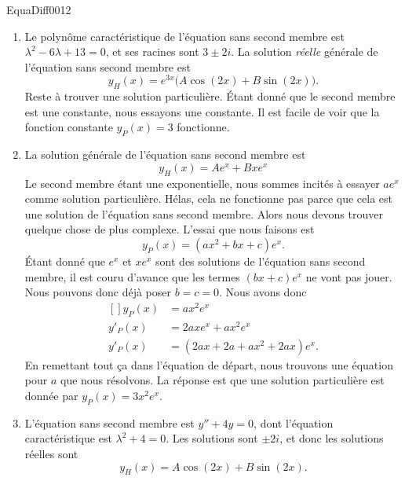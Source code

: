\begin{corrige}{EquaDiff0012}
\begin{enumerate}
		\item
			Le polynôme caractéristique de l'équation sans second membre est $\lambda^2-6\lambda+13=0$, et ses racines sont $3\pm 2i$. La solution \emph{réelle} générale de l'équation sans second membre est 
			\begin{equation}
				y_H(x)= e^{3x}\big( A\cos(2x)+B\sin(2x) \big).
			\end{equation}
			Reste à trouver une solution particulière. Étant donné que le second membre est une constante, nous essayons une constante. Il est facile de voir que la fonction constante $y_P(x)=3$ fonctionne.
		\item
			La solution générale de l'équation sans second membre est
			\begin{equation}
				y_H(x)=Ae^x+Bxe^x
			\end{equation}
			Le second membre étant une exponentielle, nous sommes incités à essayer $ae^{x}$ comme solution particulière. Hélas, cela ne fonctionne pas parce que cela est une solution de l'équation sans second membre. Alors nous devons trouver quelque chose de plus complexe. L'essai que nous faisons est
			\begin{equation}
				y_P(x)=(ax^2+bx+c) e^{x}.
			\end{equation}
			Étant donné que $ e^{x}$ et $x e^{x}$ sont des solutions de l'équation sans second membre, il est couru d'avance que les termes $(bx+c) e^{x}$ ne vont pas jouer. Nous pouvons donc déjà poser $b=c=0$. Nous avons donc
			\begin{equation}
				\begin{aligned}[]
					y_P(x)&=ax^2 e^{x}\\
					y'_P(x)&=2ax e^{x}+ax^2e^x\\
					y'_P(x)&=(2ax+2a+ax^2+2ax)e^x.
				\end{aligned}
			\end{equation}
			En remettant tout ça dans l'équation de départ, nous trouvons une équation pour $a$ que nous résolvons. La réponse est que une solution particulière est donnée par $y_P(x)=3x^2 e^{x}$.

		\item
			L'équation sans second membre est $y''+4y=0$, dont l'équation caractéristique est $\lambda^2+4=0$. Les solutions sont $\pm 2i$, et donc les solutions réelles sont
			\begin{equation}
				y_H(x)=A\cos(2x)+B\sin(2x).
			\end{equation}
			

\end{enumerate}
\end{corrige}
